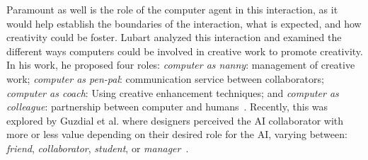 Paramount as well is the role of the computer agent in this interaction, as it would help establish the boundaries of the interaction, what is expected, and how creativity could be foster. Lubart analyzed this interaction and examined the different ways computers could be involved in creative work to promote creativity. In his work, he proposed four roles: \emph{computer as nanny}: management of creative work; \emph{computer as pen-pal}: communication service between collaborators; \emph{computer as coach}: Using creative enhancement techniques; and \emph{computer as colleague}: partnership between computer and humans~\cite{LUBART2005-computerPartners}. Recently, this was explored by Guzdial et al. where designers perceived the AI collaborator with more or less value depending on their desired role for the AI, varying between: \emph{friend}, \emph{collaborator}, \emph{student}, or \emph{manager}~\cite{Guzdial2019-AISystemDesign-Creators}.



